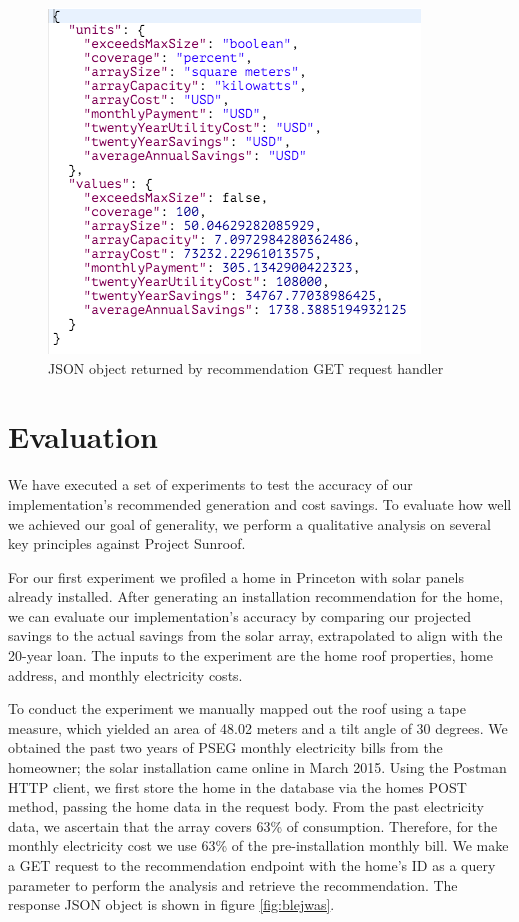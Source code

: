 \documentclass[pageno]{jpaper}
\begin{document}
\begin{figure}[h]
\begin{center}
\includegraphics[scale=0.6] {json-out}
\caption{JSON object returned by recommendation GET request handler}
\label{fig:output}
\end{center}
\end{figure}


\section{Evaluation}
We have executed a set of experiments to test the accuracy of our implementation's recommended generation and cost savings. To evaluate how well we achieved our goal of generality, we perform a qualitative analysis on several key principles against Project Sunroof.

For our first experiment we profiled a home in Princeton with solar panels already installed. After generating an installation recommendation for the home, we can evaluate our implementation's accuracy by comparing our projected savings to the actual savings from the solar array, extrapolated to align with the 20-year loan. The inputs to the experiment are the home roof properties, home address, and monthly electricity costs.

To conduct the experiment we manually mapped out the roof using a tape measure, which yielded an area of 48.02 meters and a tilt angle of 30 degrees. We obtained the past two years of PSEG monthly electricity bills from the homeowner; the solar installation came online in March 2015. Using the Postman HTTP client, we first store the home in the database via the homes POST method, passing the home data in the request body. From the past electricity data, we ascertain that the array covers 63\% of consumption. Therefore, for the monthly electricity cost we use 63\% of the pre-installation monthly bill. We make a GET request to the recommendation endpoint with the home's ID as a query parameter to perform the analysis and retrieve the recommendation. The response JSON object is shown in figure \ref{fig:blejwas}.
\end{document}
